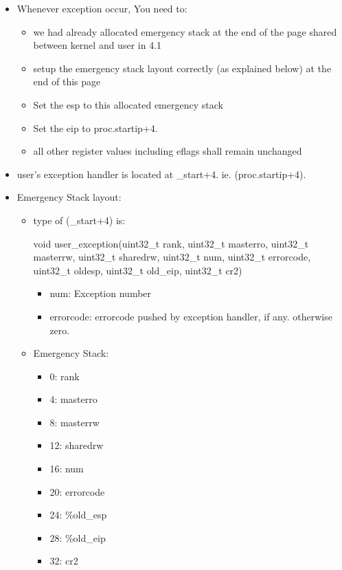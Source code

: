 \documentclass[]{article}
\newenvironment{Shaded}{}{}
\newcommand{\DataTypeTok}[1]{\textcolor[rgb]{0.50,0.00,0.00}{{#1}}}
\newcommand{\NormalTok}[1]{{#1}}
\providecommand{\tightlist}{%
  \setlength{\itemsep}{0pt}\setlength{\parskip}{0pt}}
\begin{document}
\begin{itemize}
\tightlist
\item
  Whenever exception occur, You need to:

  \begin{itemize}
  \tightlist
  \item
    we had already allocated emergency stack at the end of the page
    shared between kernel and user in 4.1
  \item
    setup the emergency stack layout correctly (as explained below) at
    the end of this page
  \item
    Set the esp to this allocated emergency stack
  \item
    Set the eip to proc.startip+4.
  \item
    all other register values including eflags shall remain unchanged
  \end{itemize}
\item
  user's exception handler is located at \_start+4. ie.
  (proc.startip+4).
\item
  Emergency Stack layout:

  \begin{itemize}
  \item
    type of (\_start+4) is:

\begin{Shaded}
\begin{Highlighting}[]
\DataTypeTok{void} \NormalTok{user_exception(}\DataTypeTok{uint32_t} \NormalTok{rank, }\DataTypeTok{uint32_t} \NormalTok{masterro, }\DataTypeTok{uint32_t} \NormalTok{masterrw, }\DataTypeTok{uint32_t} \NormalTok{sharedrw, }\DataTypeTok{uint32_t} \NormalTok{num, }\DataTypeTok{uint32_t} \NormalTok{errorcode, }\DataTypeTok{uint32_t} \NormalTok{oldesp, }\DataTypeTok{uint32_t} \NormalTok{old_eip, }\DataTypeTok{uint32_t} \NormalTok{cr2)}
\end{Highlighting}
\end{Shaded}

    \begin{itemize}
    \tightlist
    \item
      num: Exception number
    \item
      errorcode: errorcode pushed by exception handler, if any.
      otherwise zero.
    \end{itemize}
  \item
    Emergency Stack:

    \begin{itemize}
    \tightlist
    \item
      0: rank
    \item
      4: masterro
    \item
      8: masterrw
    \item
      12: sharedrw
    \item
      16: num
    \item
      20: errorcode
    \item
      24: \%old\_esp
    \item
      28: \%old\_eip
    \item
      32: cr2
    \end{itemize}
  \end{itemize}
\end{itemize}
\end{document}
